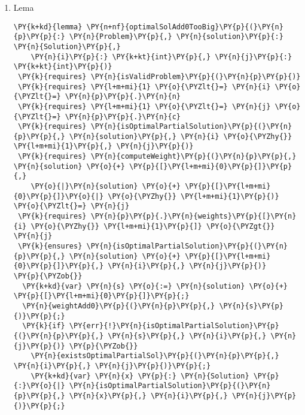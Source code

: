 \begin{sloppypar}
\begin{enumerate}
\begin{Verbatim}[commandchars=\\\{\}]
  \PY{p}{\PYZcb{}}
\PY{p}{\PYZcb{}}
\end{Verbatim}
     Demonstrația lemei este similară cu cea pentru , pornind prin a presupune că ipoteza ințială este falsă, deci există o soluție $x$ ce produce un profit mai bun. Trebuie să considerăm apartenența obiectului în $x$, iar în ambele cazuri vom folosi proprietatea de substructră optimă pentru a demonstra că $solution2 + [0]$ are un profit cel puțin la fel de bun ca $x$, deci adăugarea obiectului nu produce un profit mai bun pentru acestă subproblemă.
     \item Lema 
     \begin{Verbatim}[commandchars=\\\{\}]
\PY{k+kd}{lemma} \PY{n+nf}{optimalSolAdd0TooBig}\PY{p}{(}\PY{n}{p}\PY{p}{:} \PY{n}{Problem}\PY{p}{,} \PY{n}{solution}\PY{p}{:} \PY{n}{Solution}\PY{p}{,} 
    \PY{n}{i}\PY{p}{:} \PY{k+kt}{int}\PY{p}{,} \PY{n}{j}\PY{p}{:} \PY{k+kt}{int}\PY{p}{)}
 \PY{k}{requires} \PY{n}{isValidProblem}\PY{p}{(}\PY{n}{p}\PY{p}{)}
 \PY{k}{requires} \PY{l+m+mi}{1} \PY{o}{\PYZlt{}=} \PY{n}{i} \PY{o}{\PYZlt{}=} \PY{n}{p}\PY{p}{.}\PY{n}{n}
 \PY{k}{requires} \PY{l+m+mi}{1} \PY{o}{\PYZlt{}=} \PY{n}{j} \PY{o}{\PYZlt{}=} \PY{n}{p}\PY{p}{.}\PY{n}{c}
 \PY{k}{requires} \PY{n}{isOptimalPartialSolution}\PY{p}{(}\PY{n}{p}\PY{p}{,} \PY{n}{solution}\PY{p}{,} \PY{n}{i} \PY{o}{\PYZhy{}} \PY{l+m+mi}{1}\PY{p}{,} \PY{n}{j}\PY{p}{)}
 \PY{k}{requires} \PY{n}{computeWeight}\PY{p}{(}\PY{n}{p}\PY{p}{,} \PY{n}{solution} \PY{o}{+} \PY{p}{[}\PY{l+m+mi}{0}\PY{p}{]}\PY{p}{,} 
    \PY{o}{|}\PY{n}{solution} \PY{o}{+} \PY{p}{[}\PY{l+m+mi}{0}\PY{p}{]}\PY{o}{|} \PY{o}{\PYZhy{}} \PY{l+m+mi}{1}\PY{p}{)} \PY{o}{\PYZlt{}=} \PY{n}{j} 
 \PY{k}{requires} \PY{n}{p}\PY{p}{.}\PY{n}{weights}\PY{p}{[}\PY{n}{i} \PY{o}{\PYZhy{}} \PY{l+m+mi}{1}\PY{p}{]} \PY{o}{\PYZgt{}} \PY{n}{j}
 \PY{k}{ensures} \PY{n}{isOptimalPartialSolution}\PY{p}{(}\PY{n}{p}\PY{p}{,} \PY{n}{solution} \PY{o}{+} \PY{p}{[}\PY{l+m+mi}{0}\PY{p}{]}\PY{p}{,} \PY{n}{i}\PY{p}{,} \PY{n}{j}\PY{p}{)}
\PY{p}{\PYZob{}}
  \PY{k+kd}{var} \PY{n}{s} \PY{o}{:=} \PY{n}{solution} \PY{o}{+} \PY{p}{[}\PY{l+m+mi}{0}\PY{p}{]}\PY{p}{;}
  \PY{n}{weightAdd0}\PY{p}{(}\PY{n}{p}\PY{p}{,} \PY{n}{s}\PY{p}{)}\PY{p}{;}
  \PY{k}{if} \PY{err}{!}\PY{n}{isOptimalPartialSolution}\PY{p}{(}\PY{n}{p}\PY{p}{,} \PY{n}{s}\PY{p}{,} \PY{n}{i}\PY{p}{,} \PY{n}{j}\PY{p}{)} \PY{p}{\PYZob{}}
    \PY{n}{existsOptimalPartialSol}\PY{p}{(}\PY{n}{p}\PY{p}{,} \PY{n}{i}\PY{p}{,} \PY{n}{j}\PY{p}{)}\PY{p}{;}
    \PY{k+kd}{var} \PY{n}{x} \PY{p}{:} \PY{n}{Solution} \PY{p}{:}\PY{o}{|} \PY{n}{isOptimalPartialSolution}\PY{p}{(}\PY{n}{p}\PY{p}{,} \PY{n}{x}\PY{p}{,} \PY{n}{i}\PY{p}{,} \PY{n}{j}\PY{p}{)}\PY{p}{;}

\end{Verbatim}
\end{enumerate}
\end{sloppypar}
